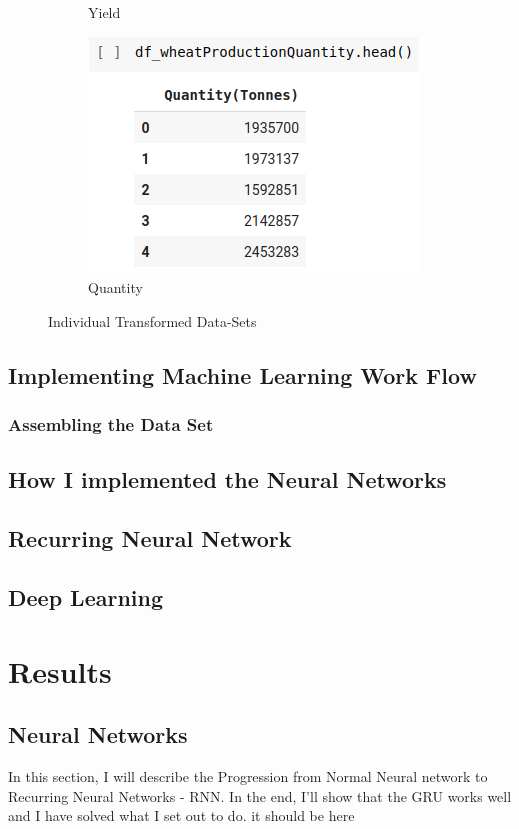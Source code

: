 \begin{figure}
\begin{subfigure}{.25\textwidth}
		\caption{Yield}
		\label{fig:sub3}
	\end{subfigure}
	\begin{subfigure}{.24\textwidth}
		\centering
		\includegraphics[width=.4\linewidth]{fig/quantityTonnes.png}
		\caption{Quantity}
		\label{fig:sub4}
	\end{subfigure}

	\caption{Individual Transformed Data-Sets}
	\label{fig:heads}
\end{figure}



\section{Implementing Machine Learning Work Flow}





\subsection{Assembling the Data Set}
\section{How I implemented the Neural Networks}
\section{Recurring Neural Network}
\section{Deep Learning}

\chapter{Results}
\section{Neural Networks}
In this section, I will describe the Progression from Normal Neural network to Recurring Neural Networks - RNN. In the end, I'll show that the GRU works well and I have solved what I set out to do. 
it should be here
